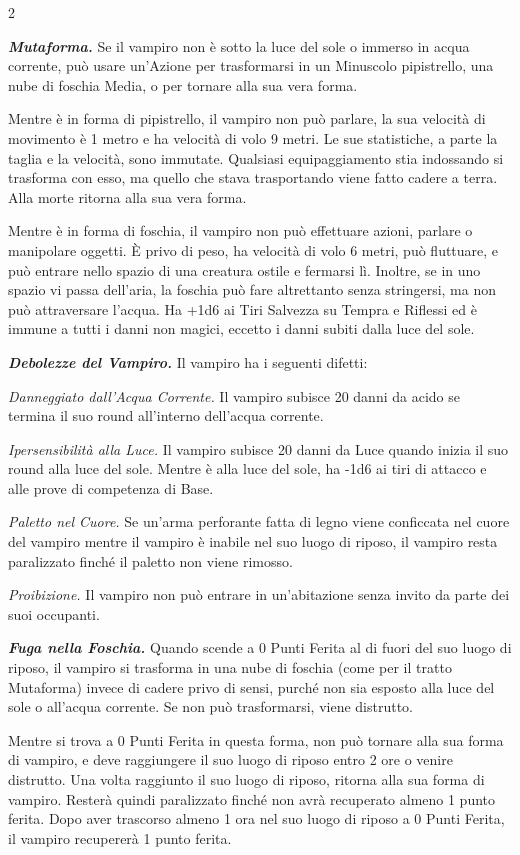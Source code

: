 \begin{multicols}{2}
{\emph{\textbf{Mutaforma.}} Se il vampiro non è sotto la luce del sole o immerso in acqua corrente, può usare un'Azione per trasformarsi in un Minuscolo pipistrello, una nube di foschia Media, o per tornare alla sua vera forma.

Mentre è in forma di pipistrello, il vampiro non può parlare, la sua velocità di movimento è 1 metro e ha velocità di volo 9 metri. Le sue statistiche, a parte la taglia e la velocità, sono immutate. Qualsiasi equipaggiamento stia indossando si trasforma con esso, ma quello che stava trasportando viene fatto cadere a terra. Alla morte ritorna alla sua vera forma.

Mentre è in forma di foschia, il vampiro non può effettuare azioni, parlare o manipolare oggetti. È privo di peso, ha velocità di volo 6 metri, può fluttuare, e può entrare nello spazio di una creatura ostile e fermarsi lì. Inoltre, se in uno spazio vi passa dell'aria, la foschia può fare altrettanto senza stringersi, ma non può attraversare l'acqua. Ha +1d6 ai Tiri Salvezza su Tempra e Riflessi ed è immune a tutti i danni non magici, eccetto i danni subiti dalla luce del
sole.

\emph{\textbf{Debolezze del Vampiro.}} Il vampiro ha i seguenti difetti:

\emph{Danneggiato dall'Acqua Corrente.} Il vampiro subisce 20 danni da acido se termina il suo round all'interno dell'acqua corrente.

\emph{Ipersensibilità alla Luce.} Il vampiro subisce 20 danni da Luce quando inizia il suo round alla luce del sole. Mentre è alla luce del sole, ha -1d6 ai tiri di attacco e alle prove di competenza di Base.

\emph{Paletto nel Cuore.} Se un'arma perforante fatta di legno viene conficcata nel cuore del vampiro mentre il vampiro è inabile nel suo luogo di riposo, il vampiro resta paralizzato finché il paletto non viene rimosso.

\emph{Proibizione.} Il vampiro non può entrare in un'abitazione senza invito da parte dei suoi occupanti.

\emph{\textbf{Fuga nella Foschia.}} Quando scende a 0 Punti Ferita al di fuori del suo luogo di riposo, il vampiro si trasforma in una nube di foschia (come per il tratto Mutaforma) invece di cadere privo di sensi, purché non sia esposto alla luce del sole o all'acqua corrente. Se non può trasformarsi, viene distrutto.

Mentre si trova a 0 Punti Ferita in questa forma, non può tornare alla sua forma di vampiro, e deve raggiungere il suo luogo di riposo entro 2 ore o venire distrutto. Una volta raggiunto il suo luogo di riposo, ritorna alla sua forma di vampiro. Resterà quindi paralizzato finché non avrà recuperato almeno 1 punto ferita. Dopo aver trascorso almeno 1 ora nel suo luogo di riposo a 0 Punti Ferita, il vampiro recupererà 1 punto ferita.

}
\end{multicols}
